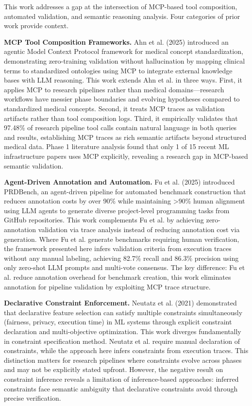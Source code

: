 
This work addresses a gap at the intersection of MCP-based tool composition, automated validation, and semantic reasoning analysis. Four categories of prior work provide context.

\textbf{MCP Tool Composition Frameworks.} Ahn et al. (2025) introduced an agentic Model Context Protocol framework for medical concept standardization, demonstrating zero-training validation without hallucination by mapping clinical terms to standardized ontologies using MCP to integrate external knowledge bases with LLM reasoning. This work extends Ahn et al. in three ways. First, it applies MCP to research pipelines rather than medical domains---research workflows have messier phase boundaries and evolving hypotheses compared to standardized medical concepts. Second, it treats MCP traces as validation artifacts rather than tool composition logs. Third, it empirically validates that 97.48\% of research pipeline tool calls contain natural language in both queries and results, establishing MCP traces as rich semantic artifacts beyond structured medical data. Phase 1 literature analysis found that only 1 of 15 recent ML infrastructure papers uses MCP explicitly, revealing a research gap in MCP-based semantic validation.

\textbf{Agent-Driven Annotation and Automation.} Fu et al. (2025) introduced PRDBench, an agent-driven pipeline for automated benchmark construction that reduces annotation costs by over 90\% while maintaining >90\% human alignment using LLM agents to generate diverse project-level programming tasks from GitHub repositories. This work complements Fu et al. by achieving zero-annotation validation via trace analysis instead of reducing annotation cost via generation. Where Fu et al. generate benchmarks requiring human verification, the framework presented here infers validation criteria from execution traces without any manual labeling, achieving 82.7\% recall and 86.3\% precision using only zero-shot LLM prompts and multi-vote consensus. The key difference: Fu et al. reduce annotation overhead for benchmark creation, this work eliminates annotation for pipeline validation by exploiting MCP trace structure.

\textbf{Declarative Constraint Enforcement.} Neutatz et al. (2021) demonstrated that declarative feature selection can satisfy multiple constraints simultaneously (fairness, privacy, execution time) in ML systems through explicit constraint declaration and multi-objective optimization. This work diverges fundamentally in constraint specification method. Neutatz et al. require manual declaration of constraints, while the approach here infers constraints from execution traces. This distinction matters for research pipelines where constraints evolve across phases and may not be explicitly stated upfront. However, the negative result on constraint inference reveals a limitation of inference-based approaches: inferred constraints face semantic ambiguity that declarative constraints avoid through precise verification.

